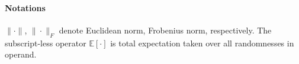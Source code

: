 \documentclass[10pt]{article} %
\theoremstyle{plain}
\theoremstyle{definition}
\theoremstyle{remark}
\newcommand{\aname}{{\tt DoCoM}}
\newcommand{\prm}{\theta}
\newcommand{\avgtheta}{\bar{\prm}}
\begin{document}
\paragraph{Notations} $\| \cdot \|$, $\| \cdot \|_F$ denote Euclidean norm, Frobenius norm, respectively. The subscript-less operator $\mathbb{E} [\cdot]$ is total expectation taken over all randomnesses in operand.\vspace{0cm}
\vspace{-.1cm}

\end{document}
